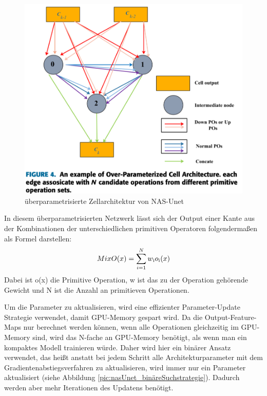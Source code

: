 \begin{figure}[H]
	
	\centering
	\includegraphics[scale=0.41]{Pictures/nasUnet/Bild3.png}
	\caption{überparametrisierte Zellarchitektur von NAS-Unet \cite{nasunetPaper} }
	\label{pic:nasUnet_Zellarchitektur_überparametrisiert}
\end{figure}


In diesem überparametrisierten Netzwerk lässt sich der Output einer Kante aus der Kombinationen der unterschiedlichen primitiven Operatoren folgendermaßen als Formel darstellen: $$MixO(x)=\sum\limits_{i=1}^{N}w\textsubscript{i}o\textsubscript{i}(x)$$
Dabei ist o(x) die Primitive Operation, w ist das zu der Operation gehörende Gewicht und N ist die Anzahl an primitieven Operationen. 

Um die Parameter zu aktualisieren, wird eine effizienter Parameter-Update Strategie verwendet, damit GPU-Memory gespart wird. Da die Output-Feature-Maps nur berechnet werden können, wenn alle Operationen gleichzeitig im GPU-Memory sind, wird das N-fache an GPU-Memory benötigt, als wenn man ein kompaktes Modell trainieren würde. Daher wird hier ein binärer Ansatz verwendet, das heißt anstatt bei jedem Schritt alle Architekturparameter mit dem Gradientenabstiegsverfahren zu aktualisieren, wird immer nur ein Parameter aktualisiert (siehe Abbildung \ref{pic:nasUnet_binäreSuchstrategie}). Dadurch werden aber mehr Iterationen des Updatens benötigt.

